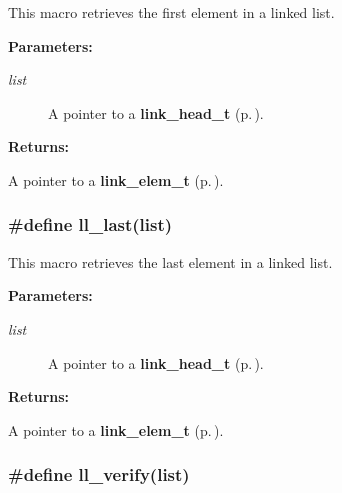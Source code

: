  This macro retrieves the first element in a linked list.\begin{Desc}
\item[{\bf Parameters: }]\par
\begin{description}
\item[
{\em list}]A pointer to a {\bf link\_\-head\_\-t} {\rm (p.\,\pageref{group__dbprim__link_a0})}.

\end{description}
\end{Desc}
\begin{Desc}
\item[{\bf Returns: }]\par
A pointer to a {\bf link\_\-elem\_\-t} {\rm (p.\,\pageref{group__dbprim__link_a1})}. \end{Desc}
\subsubsection{\setlength{\rightskip}{0pt plus 5cm}\#define ll\_\-last(list)}\label{group__dbprim__link_a17}




 This macro retrieves the last element in a linked list.\begin{Desc}
\item[{\bf Parameters: }]\par
\begin{description}
\item[
{\em list}]A pointer to a {\bf link\_\-head\_\-t} {\rm (p.\,\pageref{group__dbprim__link_a0})}.

\end{description}
\end{Desc}
\begin{Desc}
\item[{\bf Returns: }]\par
A pointer to a {\bf link\_\-elem\_\-t} {\rm (p.\,\pageref{group__dbprim__link_a1})}. \end{Desc}
\subsubsection{\setlength{\rightskip}{0pt plus 5cm}\#define ll\_\-verify(list)}\label{group__dbprim__link_a14}




